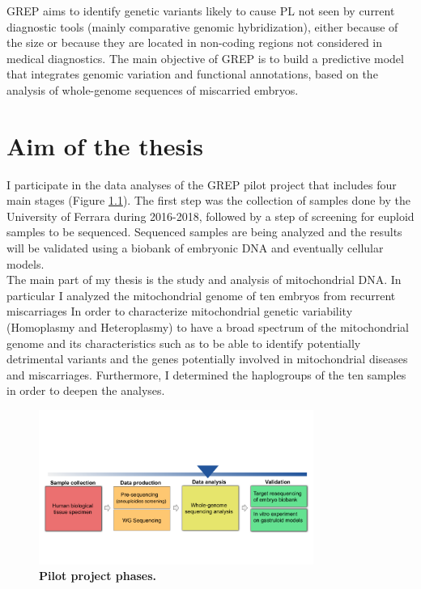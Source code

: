 GREP aims to identify genetic variants likely to cause PL not seen by current diagnostic tools (mainly comparative genomic hybridization), either because of the size or because they are located in non-coding regions not considered in medical diagnostics. The main objective of GREP is to build a predictive model that integrates genomic variation and functional annotations, based on the analysis of whole-genome sequences of miscarried embryos.\\

\chapter{Aim of the thesis }
I participate in the data analyses of the GREP pilot project that includes four main stages (Figure \ref{fig:projectPhases}). The first step was the collection of samples done by the University of Ferrara during 2016-2018, followed by a step of screening for euploid samples to be sequenced. Sequenced samples are being analyzed and the results will be validated using a biobank of embryonic DNA and eventually cellular models.\\

The main part of my thesis is the study and analysis of mitochondrial DNA. In particular I analyzed the mitochondrial genome of ten embryos from recurrent miscarriages In order to characterize mitochondrial genetic variability (Homoplasmy and Heteroplasmy) to have a broad spectrum of the mitochondrial genome and its characteristics such as to be able to identify potentially detrimental variants and the genes potentially involved in mitochondrial diseases and miscarriages.
Furthermore, I determined the haplogroups of the ten samples in order to deepen the analyses.


\begin{figure}[H]
\centering
\includegraphics[width=0.80\textwidth]{Fig/projectPhases.png}
\decoRule
\caption{\textbf{Pilot project phases.}} 
\label{fig:projectPhases}
\end{figure}







